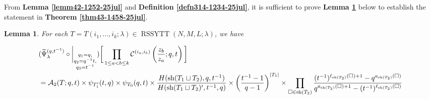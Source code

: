 \documentclass[12pt,reqno,a4paper]{amsart}
\newcommand{\comp}{\circ}
\newcommand{\cals}[1]{\mathcal{#1}}
\numberwithin{equation}{section}
\newtheorem{lem}[thm]{Lemma}
\theoremstyle{definition}
\begin{document}
From \textbf{Lemma \ref{lemm42-1252-25jul}}
and \textbf{Definition \ref{defn314-1234-25jul}}, it is sufficient to prove \textbf{Lemma \ref{lemm45-1458-25jul}} below to establish the statement in \textbf{Theorem \ref{thm43-1458-25jul}}. 

\begin{lem}
\label{lemm45-1458-25jul}
For each $T = T(i_1,\dots,i_k;\lambda) \in \operatorname{RSSYTT}(N,M,L;\lambda)$, we have 

\footnotesize
\begin{align}
	&(
	\widetilde{\Psi}_{\lambda}^{(q,t^{-1})}
	\comp 
	\bigg|_{
		\substack{
			q_1 = q, \\
			q_2 = q^{-1}t,\\
			q_3 = t^{-1} \\
		}
	}
	)
	\bigg[
	\prod_{1 \leq a < b \leq k}
	\cals{C}^{(i_a,i_b)}\left(
	\frac{z_b}{z_a}
	; q, t
	\right)
	\bigg]
	\\
	&=  
	\cals{A}_2(T;q,t) \times 
	\psi_{T^{\prime}_{1}}(t,q) \times \psi_{T_0}(q,t)
	\times
	\frac{
		H(\operatorname{sh}(T_1 \sqcup T_2),q,t^{-1})
	}{
		H(\operatorname{sh}(T_1 \sqcup T_2)^\prime,t^{-1},q)
	}
	\times
	\left(	\frac{t^{-1} - 1}{q-1}		\right)^{|T_1|}
	\notag
	\times 
	\prod_{\square \in \operatorname{sh}(T_2)}
	\frac{
		(t^{-1})^{\ell_{\operatorname{sh}(T_2)}(\square) + 1} - q^{a_{\operatorname{sh}(T_2)}(\square)}
	}{
		q^{a_{\operatorname{sh}(T_2)}(\square) + 1} - (t^{-1})^{\ell_{\operatorname{sh}(T_2)}(\square)}
	}
	\notag 
\end{align}
\normalsize
\end{lem}
\end{document}
